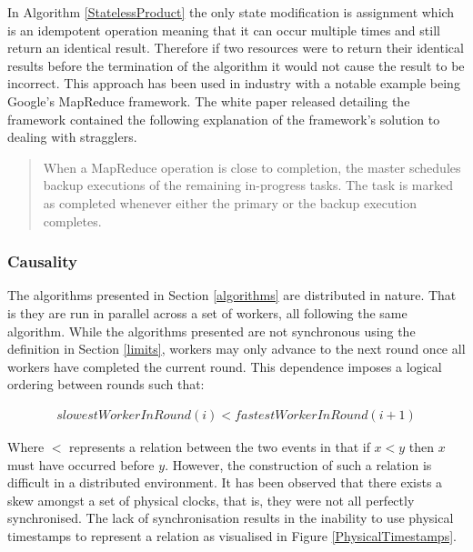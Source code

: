 \documentclass[12pt]{article}
\begin{document}
In Algorithm \ref{StatelessProduct} the only state modification is assignment which is an idempotent operation meaning that it can occur multiple times and still return an identical result. Therefore if two resources were to return their identical results before the termination of the algorithm it would not cause the result to be incorrect.
\newline
\newline
This approach has been used in industry with a notable example being Google's MapReduce framework. The white paper released detailing the framework \cite{dean2008mapreduce} contained the following explanation of the framework's solution to dealing with stragglers.

\blockquote{When a MapReduce operation is close
to completion, the master schedules backup executions
of the remaining in-progress tasks. The task is marked
as completed whenever either the primary or the backup
execution completes.}

\subsubsection{Causality}
The algorithms presented in Section \ref{algorithms} are distributed in nature. That is they are run in parallel across a set of workers, all following the same algorithm. While the algorithms presented are not synchronous using the definition in Section \ref{limits}, workers may only advance to the next round once all workers have completed the current round. This dependence imposes a logical ordering between rounds such that:

\begin{align*}
slowestWorkerInRound(i) < fastestWorkerInRound(i+1)
\end{align*}

Where $<$ represents a  relation between the two events in that if $x < y$ then $x$ must have occurred before $y$. However, the construction of such a relation is difficult in a distributed environment. It has been observed that there exists a skew amongst a set of physical clocks, that is, they were not all perfectly synchronised. The lack of synchronisation results in the inability to use physical timestamps to represent a  relation as  visualised in Figure \ref{PhysicalTimestamps}.
\end{document}
